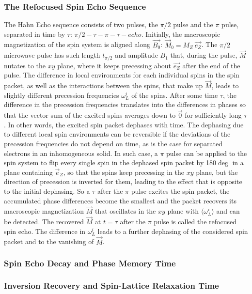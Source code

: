 \subsubsection{The Refocused Spin Echo Sequence}
The Hahn Echo sequence consists of two pulses, the $\pi/2$ pulse and the $\pi$ pulse, separated in time by $\tau$: $\pi/2 - \tau - \pi - \tau - echo$. Initially, the macroscopic magnetization of the spin system is aligned along $\vec{B_0}$: $\vec{M}_0=M_Z~\vec{e_Z}$. The $\pi/2$ microwave pulse has such length $t_{\pi/2}$ and amplitude $B_1$ that, during the pulse, $\vec{M}$ nutates to the $xy$ plane, where it keeps precessing about $\vec{e_Z}$ after the end of the pulse. The difference in local environments for each individual spins in the spin packet, as well as the interactions between the spins, that make up $\vec{M}$, leads to slightly different precession frequencies $\omega_L^i$ of the spins. After some time $\tau$, the difference in the precession frequencies translates into the differences in phases so that the vector sum of the excited spins averages down to $\vec{0}$ for sufficiently long $\tau$. In other words, the excited spin packet dephases with time. The dephasing due to different local spin environments can be reversible if the deviations of the precession frequencies do not depend on time, as is the case for separated electrons in an inhomogeneous solid. In such case, a $\pi$ pulse can be applied to the spin system to flip every single spin in the dephased spin packet by 180$\deg$ in a plane containing $\vec{e}_Z$, so that the spins keep precessing in the $xy$ plane, but the direction of precession is inverted for them, leading to the effect that is opposite to the initial dephasing. So a $\tau$ after the $\pi$ pulse excites the spin packet, the accumulated phase differences become the smallest and the packet recovers its macroscopic magnetization $\vec{M}$ that oscillates in the $xy$ plane with $\langle\omega_L^i\rangle$ and can be detected. The recovered $\vec{M}$ at $t=\tau$ after the $\pi$ pulse is called the refocused spin echo. The difference in $\omega_L^i$ leads to a further dephasing of the considered spin packet and to the vanishing of $\vec{M}$.\\
\subsubsection{Spin Echo Decay and Phase Memory Time}


\subsubsection{Inversion Recovery and Spin-Lattice Relaxation Time}

